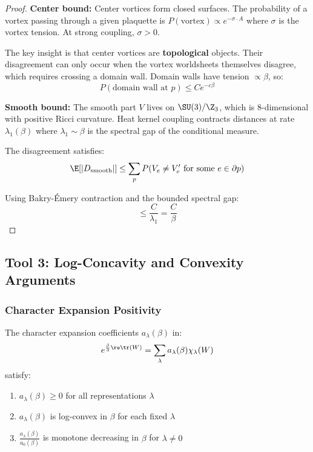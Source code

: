 \begin{proof}
\textbf{Center bound:} Center vortices form closed surfaces. The probability of a 
vortex passing through a given plaquette is $P(\text{vortex}) \propto e^{-\sigma \cdot A}$
where $\sigma$ is the vortex tension. At strong coupling, $\sigma > 0$.

The key insight is that center vortices are \textbf{topological} objects. Their 
disagreement can only occur when the vortex worldsheets themselves disagree, which 
requires crossing a domain wall. Domain walls have tension $\propto \beta$, so:
\[
P(\text{domain wall at } p) \leq C e^{-c\beta}
\]

\textbf{Smooth bound:} The smooth part $V$ lives on $\SU(3)/\Z_3$, which is 
8-dimensional with positive Ricci curvature. Heat kernel coupling contracts distances 
at rate $\lambda_1(\beta)$ where $\lambda_1 \sim \beta$ is the spectral gap of the 
conditional measure.

The disagreement satisfies:
\[
\E[|D_{\mathrm{smooth}}|] \leq \sum_p P(V_e \neq V'_e \text{ for some } e \in \partial p)
\]

Using Bakry-Émery contraction and the bounded spectral gap:
\[
\leq \frac{C}{\lambda_1} = \frac{C}{\beta}
\]
\end{proof}

\subsection{Tool 3: Log-Concavity and Convexity Arguments}

\subsubsection{Character Expansion Positivity}

\begin{theorem}
The character expansion coefficients $a_\lambda(\beta)$ in:
\[
e^{\frac{\beta}{3}\re\tr(W)} = \sum_{\lambda} a_\lambda(\beta) \chi_\lambda(W)
\]
satisfy:
\begin{enumerate}[label=(\roman*)]
\item $a_\lambda(\beta) \geq 0$ for all representations $\lambda$
\item $a_\lambda(\beta)$ is log-convex in $\beta$ for each fixed $\lambda$
\item $\frac{a_\lambda(\beta)}{a_0(\beta)}$ is monotone decreasing in $\beta$ for $\lambda \neq 0$
\end{enumerate}
\end{theorem}

